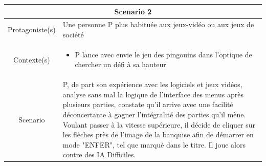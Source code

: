 \documentclass{report}
\begin{document}
\vspace{0.4cm} 
 
  \begin{tabular}{|c|l|}
  \hline
 \multicolumn{2}{|c|}{Scenario 2}\\
 \hline
 Protagoniste(s) & Une personne P plus habituée aux jeux-vidéo ou aux jeux de société \\
 \hline
 Contexte(s) & \parbox{13cm} {\begin{itemize}
 	\item P lance avec envie le jeu des pingouins dans l'optique de chercher un défi à sa hauteur
\end{itemize} }\\
 \hline
 Scenario & \parbox{13cm}{ P, de part son expérience avec les logiciels et jeux vidéos, analyse sans mal la logique de l'interface des menus après plusieurs parties, constate qu'il arrive avec une facilité déconcertante à gagner l'intégralité des parties qu'il mène. Voulant passer à la vitesse supérieure, il décide de cliquer sur les flèches près de l'image de la banquise afin de démarrer en mode "ENFER", tel que marqué dans le titre. Il joue alors contre des IA Difficiles.} \\
 \hline
 \end{tabular}
 
\vspace{0.4cm} 
 
\end{document}
